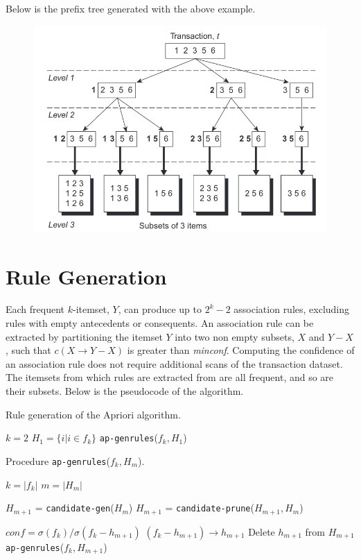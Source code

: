 Below is the prefix tree generated with the above example.

\begin{figure}[h]
    \centering
    \includegraphics[width=0.7\linewidth]{img/apriori_prefixtree.png}   
\end{figure}

\section{Rule Generation}

Each frequent $k$-itemset, $Y$, can produce up to $2^k - 2$ association rules, excluding rules with empty antecedents or consequents. An association rule can be extracted by partitioning the itemset $Y$ into two non empty subsets, $X$ and $Y-X$, such that $c(X \rightarrow Y-X)$ is greater than \textit{minconf}. Computing the confidence of an association rule does not require additional scans of the transaction dataset. The itemsets from which rules are extracted from are all frequent, and so are their subsets. Below is the pseudocode of the algorithm.

\begin{algorithm}[h]
\caption{Rule generation of the Apriori algorithm.}
\begin{algorithmic}[1]
    \State $k = 2$
        \State $H_1 = \{ i | i \in f_k \}$
        \State \texttt{ap-genrules}($f_k, H_1$)
    \EndFor
\end{algorithmic}
\end{algorithm}

\begin{algorithm}[h]
\caption{Procedure \texttt{ap-genrules}($f_k, H_m$).}
\begin{algorithmic}[1]
    \State $k = |f_k|$
    \State $m = |H_m|$

        \State $H_{m+1}$ = \texttt{candidate-gen}($H_m$)
        \State $H_{m+1}$ = \texttt{candidate-prune}($H_{m+1}, H_m$)

            \State $conf = \sigma(f_k) / \sigma(f_k - h_{m+1})$
                \State \Return $(f_k - h_{m+1}) \rightarrow h_{m+1}$
            \Else
                Delete $h_{m+1}$ from $H_{m+1}$
            \EndIf
        \EndFor
        \texttt{ap-genrules}($f_k, H_{m+1}$)
    \EndIf
\end{algorithmic}
\end{algorithm}

